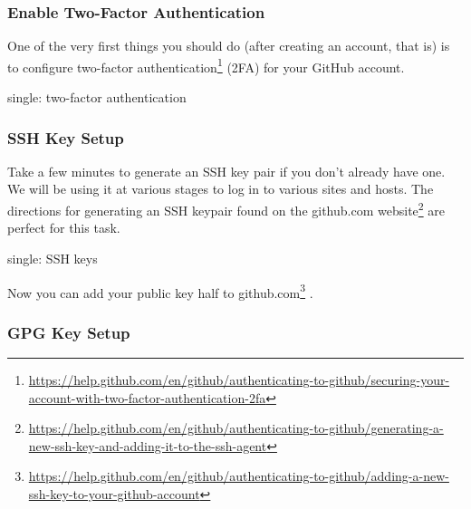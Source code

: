 \hypertarget{enable-two-factor-authentication}{%
\subsubsection{Enable Two-Factor
Authentication}\label{enable-two-factor-authentication}}

One of the very first things you should do (after creating an account,
that is) is to configure two-factor authentication\footnote{\url{https://help.github.com/en/github/authenticating-to-github/securing-your-account-with-two-factor-authentication-2fa}}
(2FA) for your GitHub account.

single: two-factor authentication

\hypertarget{ssh-key-setup}{%
\subsubsection{SSH Key Setup}\label{ssh-key-setup}}

Take a few minutes to generate an SSH key pair if you don't already have
one. We will be using it at various stages to log in to various sites
and hosts. The directions for generating an SSH keypair found on the
github.com website\footnote{\url{https://help.github.com/en/github/authenticating-to-github/generating-a-new-ssh-key-and-adding-it-to-the-ssh-agent}}
are perfect for this task.

single: SSH keys

\begin{Shaded}
\begin{Highlighting}[]
\BuiltInTok{:}
\BuiltInTok{:}
\end{Highlighting}
\end{Shaded}

Now you can add your public key half to github.com\footnote{\url{https://help.github.com/en/github/authenticating-to-github/adding-a-new-ssh-key-to-your-github-account}}
.

\hypertarget{gpg-key-setup}{%
\subsubsection{GPG Key Setup}\label{gpg-key-setup}}

